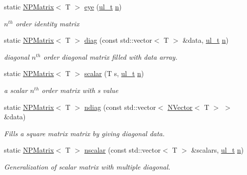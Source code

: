 \begin{DoxyCompactItemize}
static \mbox{\hyperlink{class_n_p_matrix}{N\+P\+Matrix}}$<$ T $>$ \mbox{\hyperlink{class_n_p_matrix_a38961696b973ca0ff6ac098580c6974f}{eye}} (\mbox{\hyperlink{group___n_algebra_ga1b140a2034db3f5dfe18a987745df43a}{ul\+\_\+t}} \mbox{\hyperlink{class_n_p_matrix_afc181b7652d9427125c72c38d7c1498d}{n}})
\begin{DoxyCompactList}\small\item\em $ n^{th} $ order identity matrix \end{DoxyCompactList}\item 
static \mbox{\hyperlink{class_n_p_matrix}{N\+P\+Matrix}}$<$ T $>$ \mbox{\hyperlink{class_n_p_matrix_ae73ef1ba99fe04c35af30adc3bfbd1dc}{diag}} (const std\+::vector$<$ T $>$ \&data, \mbox{\hyperlink{group___n_algebra_ga1b140a2034db3f5dfe18a987745df43a}{ul\+\_\+t}} \mbox{\hyperlink{class_n_p_matrix_afc181b7652d9427125c72c38d7c1498d}{n}})
\begin{DoxyCompactList}\small\item\em diagonal $ n^{th} $ order diagonal matrix filled with data array. \end{DoxyCompactList}\item 
static \mbox{\hyperlink{class_n_p_matrix}{N\+P\+Matrix}}$<$ T $>$ \mbox{\hyperlink{class_n_p_matrix_a3195b8dd4a279c3018122c3053997f8c}{scalar}} (T s, \mbox{\hyperlink{group___n_algebra_ga1b140a2034db3f5dfe18a987745df43a}{ul\+\_\+t}} \mbox{\hyperlink{class_n_p_matrix_afc181b7652d9427125c72c38d7c1498d}{n}})
\begin{DoxyCompactList}\small\item\em a scalar $ n^{th} $ order matrix with {\ttfamily s} value \end{DoxyCompactList}\item 
static \mbox{\hyperlink{class_n_p_matrix}{N\+P\+Matrix}}$<$ T $>$ \mbox{\hyperlink{class_n_p_matrix_a16aa6a18c33005300049ab1a39cbfbc2}{ndiag}} (const std\+::vector$<$ \mbox{\hyperlink{class_n_vector}{N\+Vector}}$<$ T $>$ $>$ \&data)
\begin{DoxyCompactList}\small\item\em Fills a square matrix matrix by giving diagonal data. \end{DoxyCompactList}\item 
static \mbox{\hyperlink{class_n_p_matrix}{N\+P\+Matrix}}$<$ T $>$ \mbox{\hyperlink{class_n_p_matrix_aa2540f387990e3db6551bd88bc5d43d9}{nscalar}} (const std\+::vector$<$ T $>$ \&scalars, \mbox{\hyperlink{group___n_algebra_ga1b140a2034db3f5dfe18a987745df43a}{ul\+\_\+t}} \mbox{\hyperlink{class_n_p_matrix_afc181b7652d9427125c72c38d7c1498d}{n}})
\begin{DoxyCompactList}\small\item\em Generalization of scalar matrix with multiple diagonal. \end{DoxyCompactList}\end{DoxyCompactItemize}
